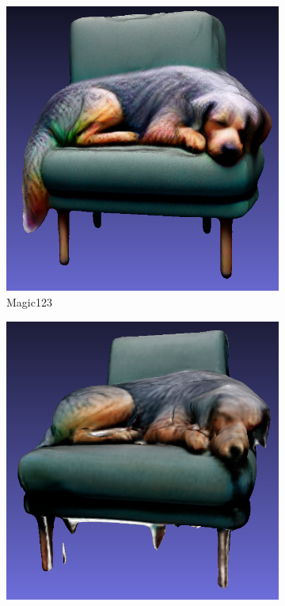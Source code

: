 \begin{figure}[ht]
    \begin{subfigure}[b]{0.267\textwidth}
        \centering
        \includegraphics[width=\textwidth]{etc/a high-quality rendering of a big dog sleeping on a chair/magic123/magic123_dog_front_result.png}
        \caption{Magic123}
        \vspace{0.1cm}
    \end{subfigure}
    \begin{subfigure}[b]{0.27\textwidth}
        \centering
        \includegraphics[width=\textwidth]{etc/a high-quality rendering of a big dog sleeping on a chair/wonder3D/wonder3D_dog_front_result.png}

\end{subfigure}
\end{figure}
